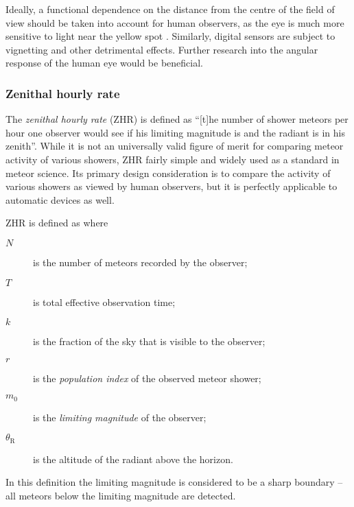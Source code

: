             Ideally, a functional dependence on the distance from the centre of the field
            of view should be taken into account for human observers, as the eye is much more
            sensitive to light near the yellow spot .
            Similarly, digital sensors are subject to vignetting and other detrimental effects.
            Further research into the angular response of the human eye would be beneficial.

        \subsubsection{Zenithal hourly rate} \label{mspz}
            The \emph{zenithal hourly rate} (ZHR) is defined as ``[t]he number of shower meteors per hour
            one observer would see if his limiting magnitude is  and the radiant is in his zenith''.
            While it is not an universally valid figure of merit for comparing meteor activity of various showers,
            ZHR fairly simple and widely used as a standard in meteor science.
            Its primary design consideration is to compare the activity of various showers as viewed by human observers,
            but it is perfectly applicable to automatic devices as well.

            ZHR is defined as
            where
            \begin{description}
                \item[$N$]
                    is the number of meteors recorded by the observer;
                \item[$T$]
                    is total effective observation time;
                \item[$k$]
                    is the fraction of the sky that is visible to the observer;
                \item[$r$]
                    is the \emph{population index} of the observed meteor shower;
                \item[$m_0$]
                    is the \emph{limiting magnitude} of the observer;
                \item[$\theta_\mathrm{R}$]
                    is the altitude of the radiant above the horizon.
            \end{description}
            In this definition the limiting magnitude is considered to be a sharp boundary -- all
            meteors below the limiting magnitude are detected.

